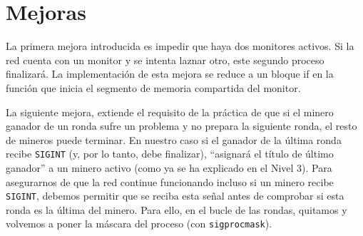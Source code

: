\documentclass{article}
\begin{document}
\section*{Mejoras}
La primera mejora introducida es impedir que haya dos monitores activos. Si la red cuenta con un monitor y se intenta laznar otro, este segundo proceso finalizará. La implementación de esta mejora se reduce a un bloque if en la función que inicia el segmento de memoria compartida del monitor.

La siguiente mejora, extiende el requisito de la práctica de que si el minero ganador de un ronda sufre un problema y no prepara la siguiente ronda, el resto de mineros puede terminar. En nuestro caso si el ganador de la última ronda recibe \texttt{SIGINT} (y, por lo tanto, debe finalizar), ``asignará el título de último ganador'' a un minero activo (como ya se ha explicado en el Nivel 3). Para asegurarnos de que la red continue funcionando incluso si un minero recibe \texttt{SIGINT}, debemos permitir que se reciba esta señal antes de comprobar si esta ronda es la última del minero. Para ello, en el bucle de las rondas, quitamos y volvemos a poner la máscara del proceso (con \texttt{sigprocmask}). 
\end{document}
